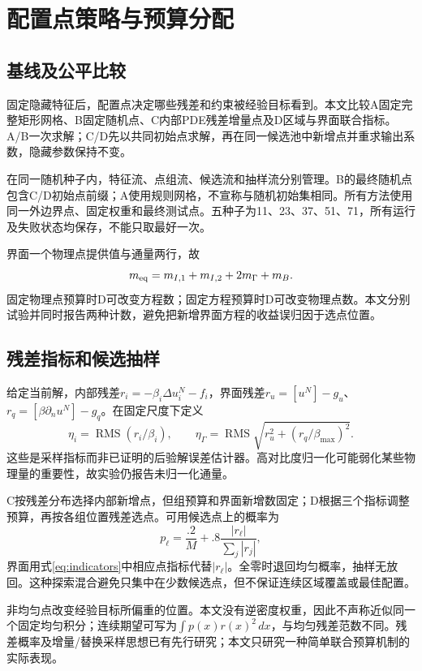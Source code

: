 \chapter{配置点策略与预算分配}
\section{基线及公平比较}
固定隐藏特征后，配置点决定哪些残差和约束被经验目标看到。本文比较A固定完整矩形网格、B固定随机点、C内部PDE残差增量点及D区域与界面联合指标。A/B一次求解；C/D先以共同初始点求解，再在同一候选池中新增点并重求输出系数，隐藏参数保持不变。

在同一随机种子内，特征流、点组流、候选流和抽样流分别管理。B的最终随机点包含C/D初始点前缀；A使用规则网格，不宣称与随机初始集相同。所有方法使用同一外边界点、固定权重和最终测试点。五种子为11、23、37、51、71，所有运行及失败状态均保存，不能只取最好一次。

界面一个物理点提供值与通量两行，故
\begin{equation}
m_{\rm eq}=m_{I,1}+m_{I,2}+2m_\Gamma+m_B.
\end{equation}
固定物理点预算时D可改变方程数；固定方程预算时D可改变物理点数。本文分别试验并同时报告两种计数，避免把新增界面方程的收益误归因于选点位置。

\section{残差指标和候选抽样}
给定当前解，内部残差$r_i=-\beta_i\Delta u_i^N-f_i$，界面残差$r_u=[u^N]-g_u$、$r_q=[\beta\partial_nu^N]-g_q$。在固定尺度下定义
\begin{equation}\label{eq:indicators}
\eta_i=\operatorname{RMS}(r_i/\beta_i),\qquad
\eta_\Gamma=\operatorname{RMS}\sqrt{r_u^2+(r_q/\beta_{\max})^2}.
\end{equation}
这些是采样指标而非已证明的后验解误差估计器。高对比度归一化可能弱化某些物理量的重要性，故实验仍报告未归一化通量。

C按残差分布选择内部新增点，但组预算和界面新增数固定；D根据三个指标调整预算，再按各组位置残差选点。可用候选点上的概率为
\begin{equation}
p_\ell=\frac{.2}{M}+.8\frac{|r_\ell|}{\sum_j|r_j|},
\end{equation}
界面用式\eqref{eq:indicators}中相应点指标代替$|r_\ell|$。全零时退回均匀概率，抽样无放回。这种探索混合避免只集中在少数候选点，但不保证连续区域覆盖或最佳配置。

非均匀点改变经验目标所偏重的位置。本文没有逆密度权重，因此不声称近似同一个固定均匀积分；连续期望可写为$\int p(x)r(x)^2\,dx$，与均匀残差范数不同。残差概率及增量/替换采样思想已有先行研究\cite{rar}；本文只研究一种简单联合预算机制的实际表现。

